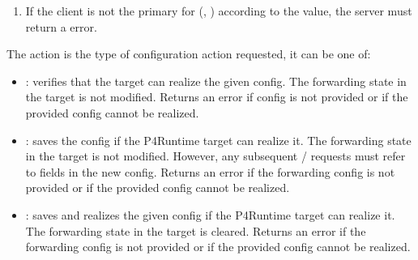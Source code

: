 \documentclass[11pt]{article}
\begin{document}
{\begin{enumerate}
\item{}
If the client is not the primary for (, ) according to
the  value, the server must return a  error.%
\end{enumerate}%

\noindent{}The action is the type of configuration action requested, it can be one of:%

\begin{itemize}%

\item{}
: verifies that the target can realize the given config. The
forwarding state in the target is not modified. Returns an 
error if config is not provided or if the provided config cannot be realized.%

\item{}
: saves the config if the P4Runtime target can realize
it. The forwarding state in the target is not modified. However, any
subsequent  /  requests must refer to fields in the new
config. Returns an  error if the forwarding config is not
provided or if the provided config cannot be realized.%

\item{}
: saves and realizes the given config if the P4Runtime
target can realize it. The forwarding state in the target is cleared. Returns
an  error if the forwarding config is not provided or if the
provided config cannot be realized.%


\end{itemize}}
\end{document}
